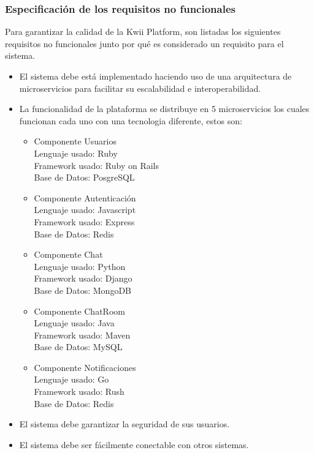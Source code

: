 \subsubsection{Especificación de los requisitos no funcionales}
Para garantizar la calidad de la Kwii Platform, son listadas los siguientes requisitos no funcionales junto por qué es considerado un requisito para el sistema.
\begin{itemize}
    \item El sistema debe está implementado haciendo uso de una arquitectura de microservicios para facilitar su escalabilidad e interoperabilidad.
    \item La funcionalidad de la plataforma se distribuye en 5 microservicios los cuales funcionan cada uno con una tecnologia diferente, estos son:
    \begin{itemize}
        \item Componente Usuarios \\
        Lenguaje usado: Ruby \\
        Framework usado: Ruby on Rails \\
        Base de Datos: PosgreSQL
        
        \item Componente Autenticación \\
        Lenguaje usado: Javascript \\
        Framework usado: Express \\
        Base de Datos: Redis
        
        \item Componente Chat \\
        Lenguaje usado: Python \\
        Framework usado: Django \\
        Base de Datos: MongoDB
        
        \item Componente ChatRoom \\
        Lenguaje usado: Java \\
        Framework usado: Maven \\
        Base de Datos: MySQL
        
        \item Componente Notificaciones \\
        Lenguaje usado: Go \\
        Framework usado: Rush \\
        Base de Datos: Redis
    \end{itemize}
    \item El sistema debe garantizar la seguridad de sus usuarios.
    \item El sistema debe ser fácilmente conectable con otros sistemas.
\end{itemize}